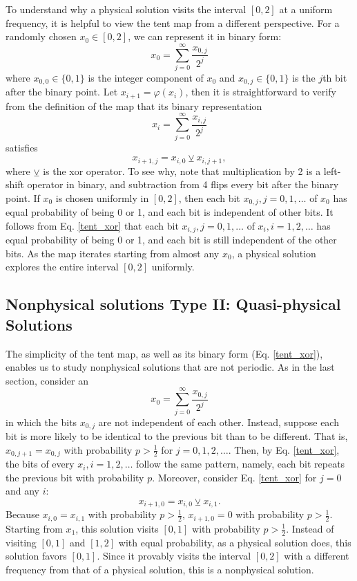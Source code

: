 To understand why a physical solution visits the interval $[0,2]$ at a uniform
frequency, it is helpful to view the tent map from a different perspective.
For a randomly chosen $x_0\in[0,2]$, we can represent it in binary form:
\begin{equation}
    x_0 = \sum_{j=0}^{\infty} \frac{x_{0,j}}{2^j}
\end{equation}
where $x_{0,0}\in\{0,1\}$ is the integer component of $x_0$ and $x_{0,j}\in\{0,1\}$ is the $j$th bit after the binary point.
Let $x_{i+1} = \varphi(x_i)$, then it is straightforward to verify from the definition
of the map that its binary representation
\begin{equation}
    x_i = \sum_{j=0}^{\infty} \frac{x_{i,j}}{2^j}
\end{equation}
satisfies
\begin{equation} \label{tent_xor}
    x_{i+1,j} = x_{i,0} \veebar x_{i,j+1},
\end{equation}
where $\veebar$ is the xor operator. To see why, note that 
multiplication by 2 is a left-shift operator in binary, and 
subtraction from 4 flips every bit after the binary point. If $x_0$ is chosen uniformly in $[0,2]$, then each bit $x_{0,j},j=0,1,\ldots$ of $x_0$
has equal probability of being 0 or 1, and each bit is independent of other bits.
It follows from Eq. \ref{tent_xor} that each bit $x_{i,j},j=0,1,\ldots$ of $x_i,
i=1,2,\ldots$ has equal probability of being 0 or 1,
and each bit is still independent of the other bits.
As the map iterates starting from almost any $x_0$, a physical solution explores the entire interval $[0,2]$ uniformly.

\subsection{Nonphysical solutions Type II: Quasi-physical Solutions}
\label{sec:quasiphysical}
The simplicity of the tent map, as well as its binary form (Eq. \ref{tent_xor}),
enables us to study nonphysical solutions that are not periodic.
As in the last section, consider an
\begin{equation}
    x_0 = \sum_{j=0}^{\infty} \frac{x_{0,j}}{2^j}
\end{equation}
in which the bits $x_{0,j}$ are not independent of each other.  Instead,
suppose each bit is more likely to be identical to the previous bit than to be different.
That is, $x_{0,j+1}=x_{0,j}$ with probability $p>\frac12$ for $j=0,1,2,\ldots$.
Then, by Eq. \ref{tent_xor}, the bits of every $x_i, i=1,2,\ldots$ follow the same pattern, namely, each bit repeats the previous bit
with probability $p$. Moreover, consider Eq. \ref{tent_xor} 
for $j=0$ and any $i$:
\begin{equation}
    x_{i+1,0} = x_{i,0} \veebar x_{i,1}.
\end{equation}
Because $x_{i,0}=x_{i,1}$ with probability $p>\frac12$, $x_{i+1,0}=0$ with probability 
$p>\frac12$.  Starting from $x_1$, this solution visits $[0,1]$ with
probability $p>\frac12$.  Instead of visiting $[0,1]$ and $[1,2]$ with
equal probability, as a physical solution does, this solution favors $[0,1]$. Since it provably visits the interval $[0,2]$ with a different frequency from that
of a physical solution, this is a nonphysical solution.

